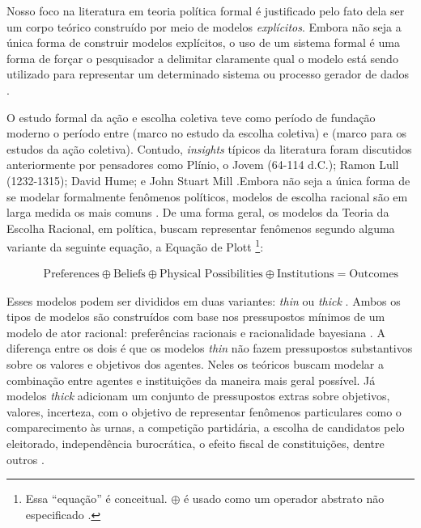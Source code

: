 Nosso foco na literatura em teoria política formal é justificado pelo fato dela
ser um corpo teórico construído por meio de modelos
\textit{explícitos}\cite{epstein2008model}. Embora não seja a única forma de
construir modelos explícitos, o uso de um sistema formal é uma forma de forçar o
pesquisador a delimitar claramente qual o modelo está sendo utilizado para
representar um determinado sistema ou processo gerador de dados
\cite{morton1999methods, smaldino2017models}.

O estudo formal da ação e escolha coletiva teve como período de fundação moderno
o período entre  (marco no estudo da escolha
coletiva) e  (marco para os estudos da ação
coletiva). Contudo, \textit{insights} típicos da literatura foram discutidos
anteriormente por pensadores como Plínio, o Jovem (64-114 d.C.); Ramon Lull
(1232-1315); David Hume; e John Stuart Mill \cite{mclean2015strange,
  sep-free-rider, ordeshook1990emerging}.Embora não seja a única forma de se
modelar formalmente fenômenos políticos, modelos de escolha racional são em
larga medida os mais comuns \cite{austen1998social}. De uma forma geral, os
modelos da Teoria da Escolha Racional, em política, buscam representar fenômenos
segundo alguma variante da seguinte equação, a Equação de Plott
\cite{munger2015choosing, ostrom1986agenda}\footnote{Essa ``equação'' é
  conceitual. \(\oplus\) é usado como um operador abstrato não especificado
  \cite{ostrom1986agenda}. }:
\begin{figure}[H]
\begin{align*}
  \text{Preferences} \oplus \text{Beliefs}  \oplus  \text{Physical Possibilities} \oplus \text{Institutions} = \text{Outcomes}
\end{align*}
\end{figure}
Esses modelos podem ser divididos em duas variantes: \textit{thin} ou
\textit{thick} \cite{hechter1997sociological, green1996pathologies}. Ambos os
tipos de modelos são construídos com base nos pressupostos mínimos de um modelo
de ator racional: preferências racionais e racionalidade bayesiana
\cite{gintis2016individuality}. A diferença entre os dois é que os modelos
\textit{thin} não fazem pressupostos substantivos sobre os valores e objetivos
dos agentes. Neles os teóricos buscam modelar a combinação entre agentes e
instituições da maneira mais geral possível. Já modelos \textit{thick} adicionam
um conjunto de pressupostos extras sobre objetivos, valores, incerteza, com o
objetivo de representar fenômenos particulares como o comparecimento às urnas, a
competição partidária, a escolha de candidatos pelo eleitorado, independência
burocrática, o efeito fiscal de constituições, dentre outros
\cite{bendor2011behavioral}.

